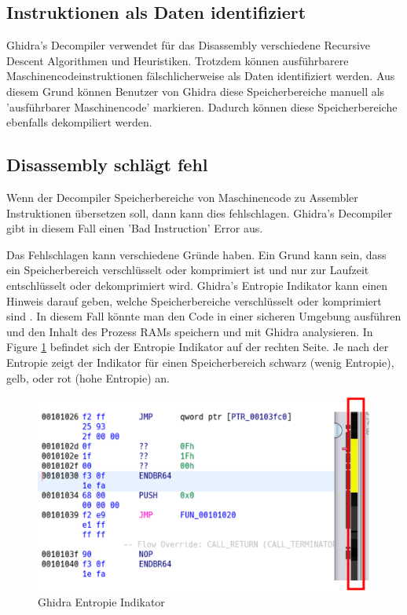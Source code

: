 \subsection{Instruktionen als Daten identifiziert}

Ghidra's Decompiler verwendet für das Disassembly verschiedene Recursive Descent Algorithmen und Heuristiken. Trotzdem können ausführbarere Maschinencodeinstruktionen fälschlicherweise als Daten identifiziert werden. Aus diesem Grund können Benutzer von Ghidra diese Speicherbereiche manuell als 'ausführbarer Maschinencode' markieren. Dadurch können diese Speicherbereiche ebenfalls dekompiliert werden. 

\subsection{Disassembly schlägt fehl}

Wenn der Decompiler Speicherbereiche von Maschinencode zu Assembler Instruktionen übersetzen soll, dann kann dies fehlschlagen. Ghidra's Decompiler gibt in diesem Fall einen 'Bad Instruction' Error aus.

Das Fehlschlagen kann verschiedene Gründe haben. Ein Grund kann sein, dass ein Speicherbereich verschlüsselt oder komprimiert ist und nur zur Laufzeit entschlüsselt oder dekomprimiert wird. Ghidra's Entropie Indikator kann einen Hinweis darauf geben, welche Speicherbereiche verschlüsselt oder komprimiert sind \cite{14}. In diesem Fall könnte man den Code in einer sicheren Umgebung ausführen und den Inhalt des Prozess RAMs speichern und mit Ghidra analysieren. In Figure \ref{fig:entropy} befindet sich der Entropie Indikator auf der rechten Seite. Je nach der Entropie zeigt der Indikator für einen Speicherbereich schwarz (wenig Entropie), gelb, oder rot (hohe Entropie) an.

\begin{figure}[!h]
	\centering
	\includegraphics[width=.45\textwidth]{img/entropy.png}
	\caption{Ghidra Entropie Indikator}
	\label{fig:entropy}
\end{figure}


